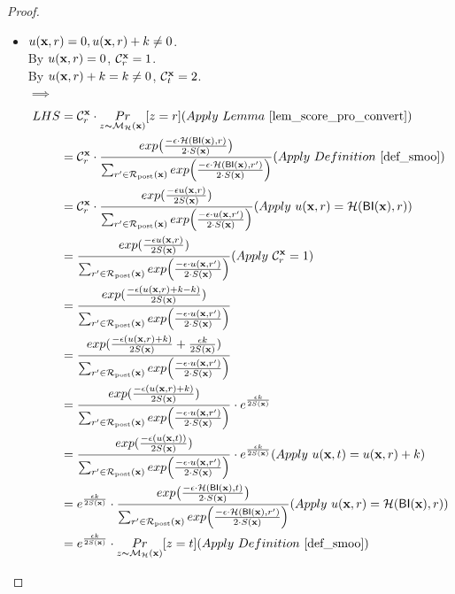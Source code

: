 \documentclass{article}
\begin{document}
\begin{proof}
\begin{itemize}
\begin{itemize}
  \end{itemize}

  \item {\boldmath$u(\textbf{x}, {r}) = 0, u(\textbf{x}, {r}) + k \neq 0$}. \\
        By $u(\textbf{x}, {r}) = 0$, $\mathcal{C}^{\textbf{x}}_{r} = 1$. \\
        By $u(\textbf{x}, {r}) + k = k \neq 0$, $\mathcal{C}^{\textbf{x}}_{t} = 2$. \\
        $\implies$
        \begin{equation*}
        \begin{split}
        LHS 
        & = \cardinality{\dataobs}{r} \cdot \hexpmechPr{\dataobs}{z = r}     (Apply\ Lemma\ \ref{lem_score_pro_convert})\\
        & = \cardinality{\dataobs}{r} \cdot \frac {exp\big(\frac{-\epsilon\cdot\hellinger(\bysinfer(\dataobs),r)}{2\cdot S(\dataobs)}\big)}{\nomalizer{\dataobs}} 
        (Apply\ Definition\ \ref{def_smoo})\\
        & = \cardinality{\dataobs}{r} \cdot \frac{exp(\frac{-\epsilon \ux{r}}{2 S(\dataobs)})}{\unomalizer{\dataobs}}
        (Apply\ \ux{r} = \hellinger(\bysinfer(\dataobs), r))\\
        & = \frac{exp(\frac{- \epsilon \ux{r}}{2 S(\dataobs)})}{\unomalizer{\dataobs}}                        (Apply \ \cardinality{\dataobs}{r} = 1) \\
        & = \frac{exp(\frac{- \epsilon (\ux{r} + k - k)}{2 S(\dataobs)})}{\unomalizer{\dataobs}}\\
        & = \frac{exp(\frac{- \epsilon (\ux{r} + k)}{2 S(\dataobs)} + \frac{\epsilon k}{2 S(\dataobs)})}{\unomalizer{\dataobs}}\\
        & = \frac{exp(\frac{-\epsilon (\ux{r} + k)}{2 S(\dataobs)})}{\unomalizer{\dataobs}} \cdot e^{\frac{\epsilon k}{2 S(\dataobs)}}\\
        & = \frac{exp(\frac{-\epsilon (\ux{t})}{2 S(\dataobs)})}{\unomalizer{\dataobs}} \cdot e^{\frac{\epsilon k}{2 S(\dataobs)}}  (Apply \ \ux{t} = \ux{r} + k)\\
        & = e^{\frac{\epsilon k}{2 S(\dataobs)}} \cdot \frac {exp\big(\frac{-\epsilon\cdot\hellinger(\bysinfer(\dataobs), t)}{2\cdot S(\dataobs)}\big)}{\nomalizer{\dataobs}} 
        (Apply\ \ux{r} = \hellinger(\bysinfer(\dataobs), r))\\
        & = e^{\frac{\epsilon k}{2 S(\dataobs)}} \cdot \hexpmechPr{\dataobs}{z = t}       (Apply\ Definition\ \ref{def_smoo})\\

\end{split}
\end{equation*}
\end{itemize}
\end{proof}
\end{document}
